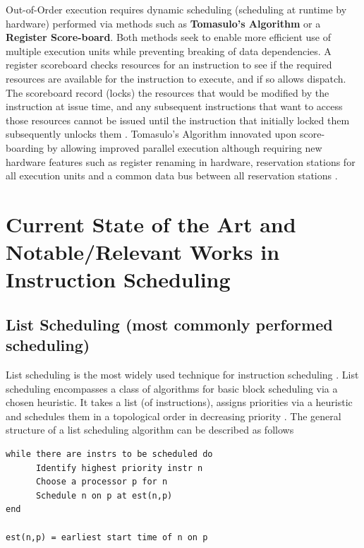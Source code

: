 \documentclass[12pt]{report}
\def\mytitle{??? Program Code ???}
\begin{document}
Out-of-Order execution requires dynamic scheduling (scheduling at runtime by
hardware) performed via methods such as \textbf{Tomasulo's Algorithm} or a \textbf{Register
Score-board}. Both methods seek to enable more efficient use of multiple
execution units while preventing breaking of data dependencies. A register
scoreboard checks resources for an instruction to see if the required
resources are available for the instruction to execute, and if so allows
dispatch. The scoreboard record (locks) the resources that would be modified
by the instruction at issue time, and any subsequent instructions that want to
access those resources cannot be issued until the instruction that initially
locked them subsequently unlocks them \parencite{popescu1997processor}.
Tomasulo's Algorithm innovated upon score-boarding by allowing improved parallel
execution although requiring new hardware features such as register renaming
in hardware, reservation stations for all execution units and a common data
bus between all reservation stations \parencite{tomasulo1967efficient}.

\chapter{Current State of the Art and Notable/Relevant Works in Instruction Scheduling}
\label{sec:org8467c39}
\section{List Scheduling (most commonly performed scheduling)}
\label{sec:org0ac07ef}
List scheduling is the most widely used technique for instruction scheduling
\parencite{gibbons1986efficient}. List scheduling encompasses a class of
algorithms for basic block scheduling via a chosen heuristic. It takes a list (of
instructions), assigns priorities via a heuristic and schedules them in a
topological order in decreasing priority \parencite{wang2018list}. The
general structure of a list scheduling algorithm can be described as follows

\def\mytitle{{\sc Basic Structure of List Scheduling Algorithms \hspace{12em} \color{grey}{.} }}
\begin{verbatim}
while there are instrs to be scheduled do 
      Identify highest priority instr n
      Choose a processor p for n
      Schedule n on p at est(n,p)
end

est(n,p) = earliest start time of n on p
\end{verbatim}
\end{document}
